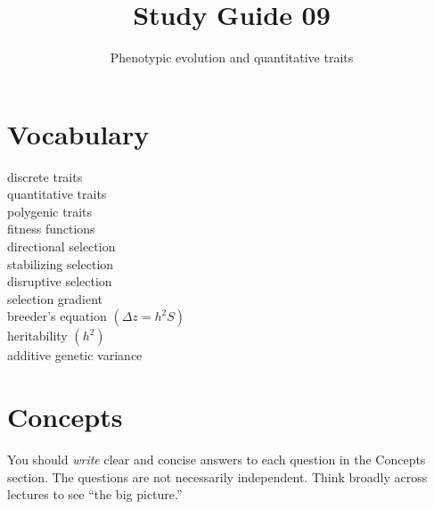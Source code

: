 \documentclass[letterpaper]{tufte-handout}
\title{Study Guide 09\hfill}
\author{Phenotypic evolution and quantitative traits}
\date{} %
\begin{document}
\maketitle	%

\section{Vocabulary}

\begin{multicols}{2}
discrete traits \\
quantitative traits \\
polygenic traits \\
fitness functions \\
directional selection \\
stabilizing selection \\
disruptive selection \\
selection gradient \\
breeder's equation $\left(\Delta z = h^2S\right)$ \\
heritability $\left(h^2\right)$ \\
additive genetic variance \\
\end{multicols}


\section{Concepts}

You should \emph{write} clear and concise answers to each question in the Concepts section.  The questions are not necessarily independent.  Think broadly across lectures to see ``the big picture.'' 
\end{document}
